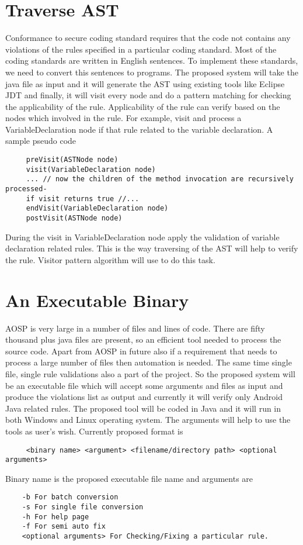    \section{Traverse AST}
    Conformance to secure coding standard requires that the code not contains any violations of the
    rules specified in a particular coding standard. Most of the coding standards are written in English sentences. To implement these standards, we need to convert this sentences to programs. The proposed system will 
    take the java file as input and it will generate the AST using existing tools like Eclipse JDT and finally, it will visit every node and do a pattern matching for checking the applicability of the rule. Applicability of the rule can verify based on the nodes which involved in the rule. For example, visit and process a VariableDeclaration node if that rule related to the variable declaration. 
    \newline
    A sample pseudo code 
   
    \begin{verbatim}
     preVisit(ASTNode node)
     visit(VariableDeclaration node)
     ... // now the children of the method invocation are recursively processed-
     if visit returns true //...
     endVisit(VariableDeclaration node)
     postVisit(ASTNode node) 
    \end{verbatim}
    During the visit in VariableDeclaration node apply the validation of variable declaration related rules. This is the way traversing of the AST will help to verify the rule. Visitor pattern algorithm will use to do this task.
    
    \section{An Executable Binary}
    
    AOSP is very large in a number of files and lines of code. There are fifty thousand plus java files are present, so an efficient tool needed to process the source code. Apart from AOSP in future also if a requirement that needs to process a large number of files then automation is needed. The same time single file, single rule validations also a part of the project. So the proposed system will be an executable file which will accept some arguments and files as input and produce the violations list as output and currently it will verify only Android Java related rules. The proposed tool will be coded in Java and it will run in both Windows and Linux operating system.  The arguments will help to use the tools as user's wish. Currently proposed format is 
    \begin{verbatim}
     <binary name> <argument> <filename/directory path> <optional arguments>
       \end{verbatim}
    Binary name is the proposed executable file name and arguments are 
    \begin{verbatim}
    -b For batch conversion
    -s For single file conversion
    -h For help page
    -f For semi auto fix
    <optional arguments> For Checking/Fixing a particular rule.
     \end{verbatim}
